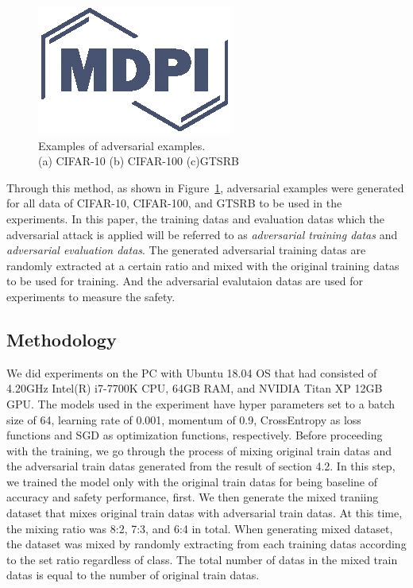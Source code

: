 \documentclass[journal,article,submit,moreauthors,pdftex]{Definitions/mdpi}
\begin{document}
\begin{figure}[H]
\includegraphics[width=5 cm]{Definitions/logo-mdpi}
\caption{Examples of adversarial examples.\\(a) CIFAR-10 (b) CIFAR-100 (c)GTSRB\label{fig5}}
\end{figure} 

Through this method, as shown in Figure~\ref{fig5}, adversarial examples were generated for all data of CIFAR-10, CIFAR-100, and GTSRB to be used in the experiments.
In this paper, the training datas and evaluation datas which the adversarial attack is applied will be referred to as {\it adversarial training datas} and {\it adversarial evaluation datas}.
The generated adversarial training datas are randomly extracted at a certain ratio and mixed with the original training datas to be used for training. And the adversarial evalutaion datas are used for experiments to measure the safety.

\subsection{Methodology} %

We did experiments on the PC with Ubuntu 18.04 OS that had consisted of 4.20GHz Intel(R) i7-7700K CPU, 64GB RAM, and NVIDIA Titan XP 12GB GPU. The models used in the experiment have hyper parameters set to a batch size of 64, learning rate of 0.001, momentum of 0.9, CrossEntropy as loss functions and SGD as optimization functions, respectively.
Before proceeding with the training, we go through the process of mixing original train datas and the adversarial train datas generated from the result of section 4.2.
In this step, we trained the model only with the original train datas for being baseline of accuracy and safety performance, first. We then generate the mixed traniing dataset that mixes original train datas with adversarial train datas.
At this time, the mixing ratio was 8:2, 7:3, and 6:4 in total. When generating mixed dataset, the dataset was mixed by randomly extracting from each training datas according to the set ratio regardless of class.
The total number of datas in the mixed train datas is equal to the number of original train datas.
\end{document}
